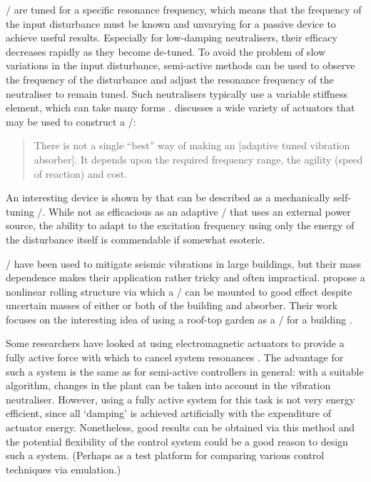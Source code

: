 \Vibneut/ are tuned for a specific resonance frequency, which means that the frequency of the input disturbance must be known and unvarying for a passive device to achieve useful results.
Especially for low-damping neutralisers, their efficacy decreases rapidly as they become de-tuned.
To avoid the problem of slow variations in the input disturbance, semi-active methods can be used to observe the frequency of the disturbance and adjust the resonance frequency of the neutraliser to remain tuned.
Such neutralisers typically use a variable stiffness element, which can take many forms \cite{ting-kong1999,kidner2002,holdhusen2007}.
\textcite{brennan2006} discusses a wide variety of actuators that may be used to construct a \vibneut/:
\begin{quote}
There is not a single ``best'' way of making an [adaptive tuned vibration absorber].
It depends upon the required frequency range, the agility (speed of reaction) and cost.
\end{quote}

An interesting device is shown by \textcite{ivers2008} that can be described as a mechanically self-tuning \vibneut/.
While not as efficacious as an adaptive \vibneut/ that uses an external power source, the ability to adapt to the excitation frequency using only the energy of the disturbance itself is commendable if somewhat esoteric.

\Vibneut/ have been used to mitigate seismic vibrations in large buildings, but their mass dependence makes their application rather tricky and often impractical. 
\textcite{matta2008} propose a nonlinear rolling structure via which a \vibneut/ can be mounted to good effect despite uncertain masses of either or both of the building and absorber.
Their work focuses on the interesting idea of using a roof-top garden as a \vibneut/ for a building \cite{matta2008a}.

Some researchers have looked at using electromagnetic actuators to provide a fully active force with which to cancel system resonances \cite{chen2005a,wu2007,kim2008-iecst}.
The advantage for such a system is the same as for semi-active controllers in general: with a suitable algorithm, changes in the plant can be taken into account in the vibration neutraliser.
However, using a fully active system for this task is not very energy efficient, since all `damping' is achieved artificially with the expenditure of actuator energy.
Nonetheless, good results can be obtained via this method and the potential flexibility of the control system could be a good reason to design such a system.
(Perhaps as a test platform for comparing various control techniques via emulation.)

